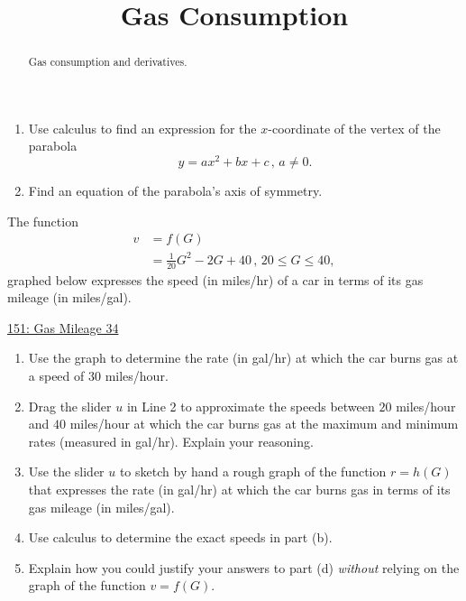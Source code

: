\documentclass{ximera}
\title{Gas Consumption}
\begin{document}
\begin{abstract}
Gas consumption and derivatives.
\end{abstract}
\maketitle


\begin{question}  \label{Qkdfjeregd}
\begin{enumerate}

\item Use calculus to find an expression for the $x$-coordinate of the vertex of the parabola
\[
    y = ax^2 + bx + c \, , \, a\neq 0.
\]

\item Find an equation of the parabola's axis of symmetry.

\end{enumerate}
\end{question}

\begin{question} \label{Qghlfgvnhhgeyghhg}
The function 
\begin{align*}
    v  &= f(G)    \\
         &= \frac{1}{20}G^2 - 2G + 40 \, , \, 20\leq G \leq 40 ,
\end{align*}
graphed below expresses the speed (in miles/hr) of a car in terms of its gas mileage (in miles/gal).

\begin{onlineOnly}
    \begin{center}
\end{center}
\end{onlineOnly}

\href{https://www.desmos.com/calculator/r375yhaxuj}{151: Gas Mileage 34}

\begin{enumerate}
\item Use the graph to determine the rate (in gal/hr) at which the car burns gas at a speed of $30$ miles/hour.

\item Drag the slider $u$ in Line 2 to approximate the speeds between $20$ miles/hour and $40$ miles/hour at which the car burns gas at the maximum and minimum rates (measured in gal/hr). Explain your reasoning.

\item Use the slider $u$ to sketch by hand a rough graph of the function $r=h(G)$ that expresses the rate (in gal/hr) at which the car burns gas in terms of its gas mileage (in miles/gal).

\item Use calculus to determine the exact speeds in part (b). 

\item Explain how you could justify your answers to part (d) \emph{without} relying on the graph of the function $v=f(G)$.
\end{enumerate}


\end{question}
\end{document}
